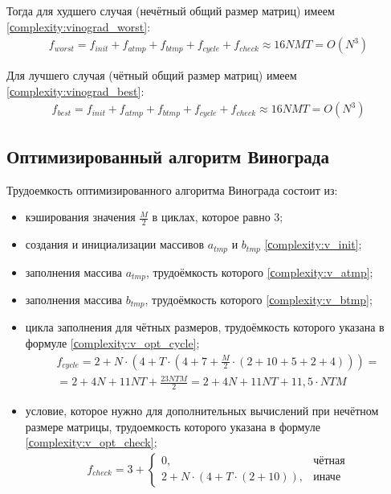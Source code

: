 Тогда для худшего случая (нечётный общий размер матриц) имеем \ref{сomplexity:vinograd_worst}:
\begin{equation}
	\label{сomplexity:vinograd_worst}
	\begin{aligned}
		f_{worst} = f_{init} + f_{atmp} + f_{btmp} + f_{cycle} + f_{check} \approx 16NMT = O(N^3)
	\end{aligned}
\end{equation}

Для лучшего случая (чётный общий размер матриц) имеем \ref{сomplexity:vinograd_best}:
\begin{equation}
	\label{сomplexity:vinograd_best}
	\begin{aligned}
		f_{best} = f_{init} + f_{atmp} + f_{btmp} + f_{cycle} + f_{check} \approx 16NMT = O(N^3)
	\end{aligned}
\end{equation}

\subsection{Оптимизированный алгоритм Винограда}

Трудоемкость оптимизированного алгоритма Винограда состоит из:
\begin{itemize}
	\item кэширования значения $\frac{M}{2}$ в циклах, которое равно 3;
	\item создания и инициализации массивов $a_{tmp}$ и $b_{tmp}$ \ref{сomplexity:v_init};
	\item заполнения массива $a_{tmp}$, трудоёмкость которого \ref{сomplexity:v_atmp};
	\item заполнения массива $b_{tmp}$, трудоёмкость которого \ref{сomplexity:v_btmp};
	\item цикла заполнения для чётных размеров, трудоёмкость которого указана в формуле \ref{сomplexity:v_opt_cycle};
	\begin{equation}
		\label{сomplexity:v_opt_cycle}
		\begin{aligned}
			f_{cycle} = 2 + N \cdot (4 + T \cdot (4 + 7 + \frac{M}{2} \cdot (2 + 10 + 5 + 2 + 4))) = \\
			= 2 + 4N + 11NT + \frac{23NTM}{2}  = 2 + 4N + 11NT + 11,5 \cdot NTM 
		\end{aligned}
	\end{equation}
	\item условие, которое нужно для дополнительных вычислений при нечётном размере матрицы, трудоемкость которого указана в формуле \ref{сomplexity:v_opt_check};
	\begin{equation}
		\label{сomplexity:v_opt_check}
		\begin{aligned}
			f_{check} = 3 + 
			\begin{cases}
				0, & \text{чётная} \\
				2 + N \cdot (4 + T \cdot (2 + 10)), & \text{иначе}
			\end{cases}
		\end{aligned}  
	\end{equation}
\end{itemize}

